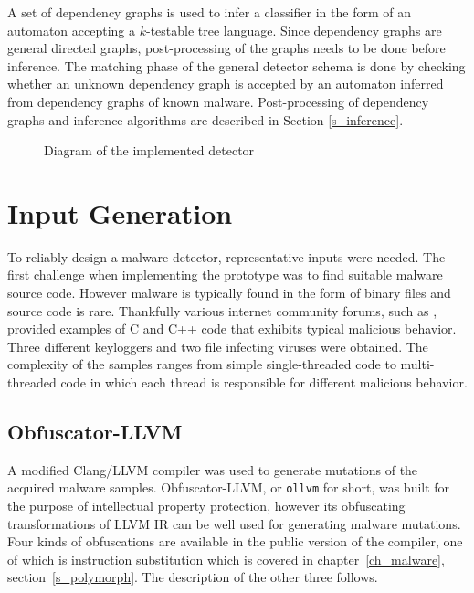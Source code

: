 A set of dependency graphs is used to infer a classifier in the form of an automaton accepting a $k$-testable tree language. Since dependency graphs are general directed graphs, post-processing of the graphs needs to be done before inference. The matching phase of the general detector schema is done by checking whether an unknown dependency graph is accepted by an automaton inferred from dependency graphs of known malware. Post-processing of dependency graphs and inference algorithms are described in Section \ref{s_inference}.

\begin{figure}[H]
    \centering
    \caption{Diagram of the implemented detector}
    \label{fig_detector}
\end{figure}

\section{Input Generation}
To reliably design a malware detector, representative inputs were needed. The first challenge when implementing the prototype was to find suitable malware source code. However malware is typically found in the form of binary files and source code is rare. Thankfully various internet community forums, such as \cite{rohitab}, provided examples of C and C++ code that exhibits typical malicious behavior. Three different keyloggers and two file infecting viruses were obtained. The complexity of the samples ranges from simple single-threaded code to multi-threaded code in which each thread is responsible for different malicious behavior.

\subsection{Obfuscator-{LLVM}} A modified {Clang/LLVM} compiler was used to generate mutations of the acquired malware samples. Obfuscator-{LLVM}, or \texttt{ollvm} for short, was built for the purpose of intellectual property protection, however its obfuscating transformations of {LLVM IR} can be well used for generating malware mutations. Four kinds of obfuscations are available in the public version of the compiler, one of which is instruction substitution which is covered in chapter~\ref{ch_malware}, section~\ref{s_polymorph}. The description of the other three follows.


